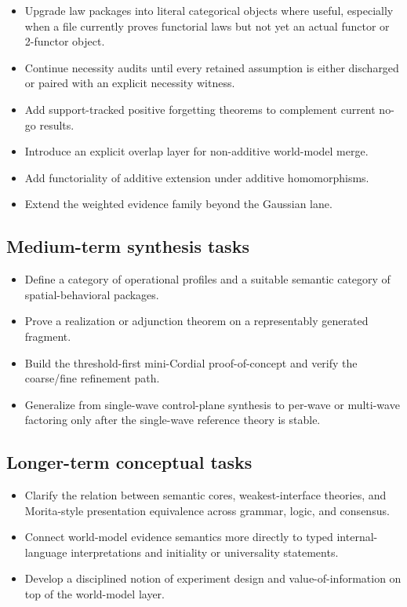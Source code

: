 \documentclass[11pt]{article}
\begin{document}
\begin{itemize}
  \item Upgrade law packages into literal categorical objects where useful, especially when a file currently proves functorial laws but not yet an actual functor or 2-functor object.
  \item Continue necessity audits until every retained assumption is either discharged or paired with an explicit necessity witness.
  \item Add support-tracked positive forgetting theorems to complement current no-go results.
  \item Introduce an explicit overlap layer for non-additive world-model merge.
  \item Add functoriality of additive extension under additive homomorphisms.
  \item Extend the weighted evidence family beyond the Gaussian lane.
\end{itemize}

\subsection{Medium-term synthesis tasks}

\begin{itemize}
  \item Define a category of operational profiles and a suitable semantic category of spatial-behavioral packages.
  \item Prove a realization or adjunction theorem on a representably generated fragment.
  \item Build the threshold-first mini-Cordial proof-of-concept and verify the coarse/fine refinement path.
  \item Generalize from single-wave control-plane synthesis to per-wave or multi-wave factoring only after the single-wave reference theory is stable.
\end{itemize}

\subsection{Longer-term conceptual tasks}

\begin{itemize}
  \item Clarify the relation between semantic cores, weakest-interface theories, and Morita-style presentation equivalence across grammar, logic, and consensus.
  \item Connect world-model evidence semantics more directly to typed internal-language interpretations and initiality or universality statements.
  \item Develop a disciplined notion of experiment design and value-of-information on top of the world-model layer.
\end{itemize}
\end{document}
